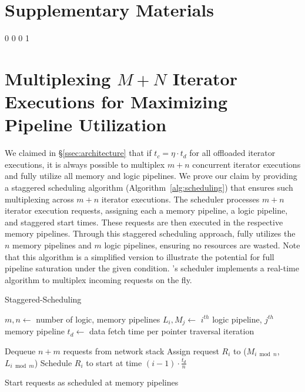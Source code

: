 \section*{Supplementary Materials}

\vspace{15pt}
\renewcommand\thesection{\Alph{section}.}
\renewcommand\thesubsection{\Alph{section}.\arabic{subsection}}
\setcounter {subfigure} {0}
\setcounter {figure} {0}
\setcounter {section} {0}
\setcounter {page} {1}

\section{Multiplexing $M+N$ Iterator Executions for Maximizing Pipeline Utilization}

We claimed in \S\ref{ssec:architecture} that if $t_c = \eta \cdot t_d$ for all offloaded iterator executions, it is always possible to multiplex $m + n$ concurrent iterator executions and fully utilize all memory and logic pipelines. We prove our claim by providing a staggered scheduling algorithm (Algorithm~\ref{alg:scheduling}) that ensures such multiplexing across $m+n$ iterator executions. The scheduler processes $m+n$ iterator execution requests, assigning each a memory pipeline, a logic pipeline, and staggered start times. These requests are then executed in the respective memory pipelines. Through this staggered scheduling approach, \jiffy fully utilizes the $n$ memory pipelines and $m$ logic pipelines, ensuring no resources are wasted. Note that this algorithm is a simplified version to illustrate the potential for full pipeline saturation under the given condition. \jiffy's scheduler implements a real-time algorithm to multiplex incoming requests on the fly.


\begin{algorithm}
\caption{Staggered-Scheduling}
\label{alg:scheduling}
\begin{algorithmic}[1]
\State $m, n \gets$ number of logic, memory pipelines
\State $L_i, M_j \gets$ $i^{th}$ logic pipeline, $j^{th}$ memory pipeline
\State $t_d \gets$ data fetch time per pointer traversal iteration

    \State Dequeue $n + m$ requests from network stack
        \State Assign request $R_i$ to ($M_{i \bmod n}$,  $L_{i \bmod m}$)
        \State Schedule $R_i$ to start at time $(i-1) \cdot \frac{t_d}{n}$
        
        
    \EndFor
    
    \State Start requests as scheduled at memory pipelines
    
\EndWhile
\end{algorithmic}
\end{algorithm}


